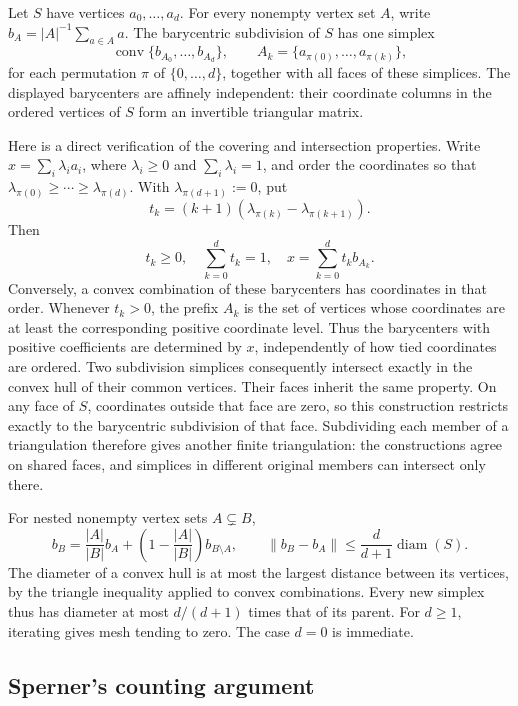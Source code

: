 \documentclass[11pt]{amsart}
\theoremstyle{definition}
\theoremstyle{remark}
\numberwithin{equation}{section}
\begin{document}
Let \(S\) have vertices \(a_0,\ldots,a_d\). For every nonempty
vertex set \(A\), write \(b_A=|A|^{-1}\sum_{a\in A}a\).
The barycentric subdivision of \(S\) has one simplex
\[
 \operatorname{conv}\{b_{A_0},\ldots,b_{A_d}\},\qquad
 A_k=\{a_{\pi(0)},\ldots,a_{\pi(k)}\},
\]
for each permutation \(\pi\) of \(\{0,\ldots,d\}\), together with
all faces of these simplices. The displayed barycenters are affinely
independent: their coordinate columns in the ordered vertices of
\(S\) form an invertible triangular matrix.

Here is a direct verification of the covering and intersection
properties. Write \(x=\sum_i\lambda_i a_i\), where
\(\lambda_i\ge0\) and \(\sum_i\lambda_i=1\), and order the
coordinates so that
\(\lambda_{\pi(0)}\ge\cdots\ge\lambda_{\pi(d)}\).
With \(\lambda_{\pi(d+1)}:=0\), put
\[
 t_k=(k+1)(\lambda_{\pi(k)}-\lambda_{\pi(k+1)}).
\]
Then
\[
 t_k\ge0,\quad \sum_{k=0}^d t_k=1,\quad
 x=\sum_{k=0}^d t_k b_{A_k}.
\]
Conversely, a convex combination of these barycenters has coordinates
in that order. Whenever \(t_k>0\), the prefix \(A_k\) is the set of
vertices whose coordinates are at least the corresponding positive
coordinate level. Thus the barycenters with positive coefficients
are determined by \(x\), independently of how tied coordinates are
ordered. Two subdivision simplices consequently intersect exactly
in the convex hull of their common vertices. Their faces inherit the
same property. On any face of \(S\), coordinates outside that face
are zero, so this construction restricts exactly to the barycentric
subdivision of that face. Subdividing each member of a triangulation
therefore gives another finite triangulation: the constructions agree
on shared faces, and simplices in different original members can
intersect only there.

For nested nonempty vertex sets \(A\subsetneq B\),
\[
 b_B=\frac{|A|}{|B|}b_A+
       \left(1-\frac{|A|}{|B|}\right)b_{B\setminus A},
 \qquad
 \|b_B-b_A\|\le\frac{d}{d+1}\operatorname{diam}(S).
\]
The diameter of a convex hull is at most the largest distance between
its vertices, by the triangle inequality applied to convex
combinations. Every new simplex thus has diameter at most
\(d/(d+1)\) times that of its parent. For \(d\ge1\), iterating
gives mesh tending to zero. The case \(d=0\) is immediate.

\subsection{Sperner's counting argument}
\end{document}
